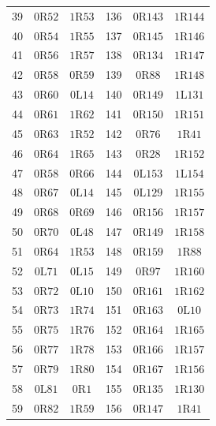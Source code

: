 \begin{longtable}{@{}rcc@{\qquad\qquad}rcc@{}}
39 & $0\mathrm{R}52$ & $1\mathrm{R}53$ & 136 & $0\mathrm{R}143$ & $1\mathrm{R}144$ \\
40 & $0\mathrm{R}54$ & $1\mathrm{R}55$ & 137 & $0\mathrm{R}145$ & $1\mathrm{R}146$ \\
41 & $0\mathrm{R}56$ & $1\mathrm{R}57$ & 138 & $0\mathrm{R}134$ & $1\mathrm{R}147$ \\
42 & $0\mathrm{R}58$ & $0\mathrm{R}59$ & 139 & $0\mathrm{R}88$ & $1\mathrm{R}148$ \\
43 & $0\mathrm{R}60$ & $0\mathrm{L}14$ & 140 & $0\mathrm{R}149$ & $1\mathrm{L}131$ \\
44 & $0\mathrm{R}61$ & $1\mathrm{R}62$ & 141 & $0\mathrm{R}150$ & $1\mathrm{R}151$ \\
45 & $0\mathrm{R}63$ & $1\mathrm{R}52$ & 142 & $0\mathrm{R}76$ & $1\mathrm{R}41$ \\
46 & $0\mathrm{R}64$ & $1\mathrm{R}65$ & 143 & $0\mathrm{R}28$ & $1\mathrm{R}152$ \\
47 & $0\mathrm{R}58$ & $0\mathrm{R}66$ & 144 & $0\mathrm{L}153$ & $1\mathrm{L}154$ \\
48 & $0\mathrm{R}67$ & $0\mathrm{L}14$ & 145 & $0\mathrm{L}129$ & $1\mathrm{R}155$ \\
49 & $0\mathrm{R}68$ & $0\mathrm{R}69$ & 146 & $0\mathrm{R}156$ & $1\mathrm{R}157$ \\
50 & $0\mathrm{R}70$ & $0\mathrm{L}48$ & 147 & $0\mathrm{R}149$ & $1\mathrm{R}158$ \\
51 & $0\mathrm{R}64$ & $1\mathrm{R}53$ & 148 & $0\mathrm{R}159$ & $1\mathrm{R}88$ \\
52 & $0\mathrm{L}71$ & $0\mathrm{L}15$ & 149 & $0\mathrm{R}97$ & $1\mathrm{R}160$ \\
53 & $0\mathrm{R}72$ & $0\mathrm{L}10$ & 150 & $0\mathrm{R}161$ & $1\mathrm{R}162$ \\
54 & $0\mathrm{R}73$ & $1\mathrm{R}74$ & 151 & $0\mathrm{R}163$ & $0\mathrm{L}10$ \\
55 & $0\mathrm{R}75$ & $1\mathrm{R}76$ & 152 & $0\mathrm{R}164$ & $1\mathrm{R}165$ \\
56 & $0\mathrm{R}77$ & $1\mathrm{R}78$ & 153 & $0\mathrm{R}166$ & $1\mathrm{R}157$ \\
57 & $0\mathrm{R}79$ & $1\mathrm{R}80$ & 154 & $0\mathrm{R}167$ & $1\mathrm{R}156$ \\
58 & $0\mathrm{L}81$ & $0\mathrm{R}1$ & 155 & $0\mathrm{R}135$ & $1\mathrm{R}130$ \\
59 & $0\mathrm{R}82$ & $1\mathrm{R}59$ & 156 & $0\mathrm{R}147$ & $1\mathrm{R}41$ \\

\end{longtable}
